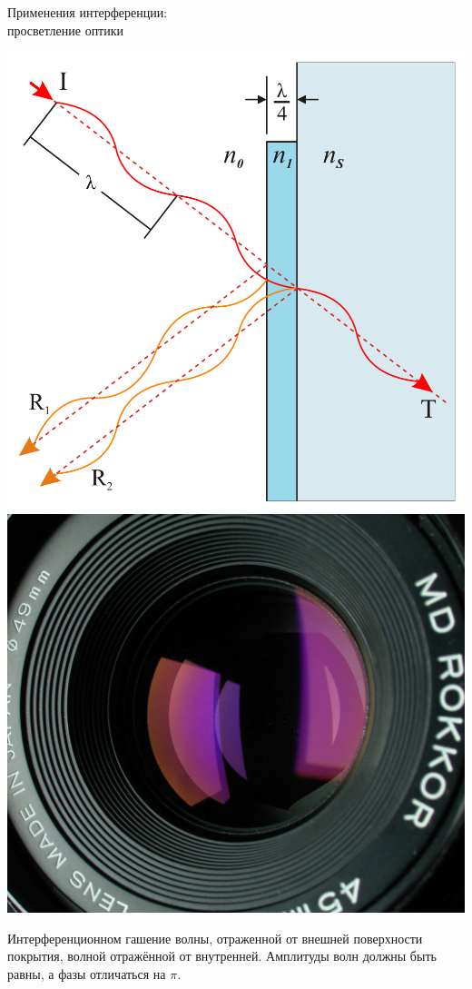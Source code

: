 \documentclass[usenames,dvipsnames,pdftex,unicode,hidelinks]{beamer}
\begin{document}
  \begin{frame}{Применения интерференции:\\ просветление оптики}
    \begin{center}
      \includegraphics[height=0.5\textheight]{antireflection}
      \includegraphics[height=0.5\textheight]{lens}
      \begin{block}{}
        Интерференционном гашение волны, отраженной от внешней поверхности покрытия, волной отражённой от внутренней.
        Амплитуды волн должны быть равны, а фазы отличаться на $\pi$.
      \end{block}
    \end{center}
  \end{frame}
\end{document}
